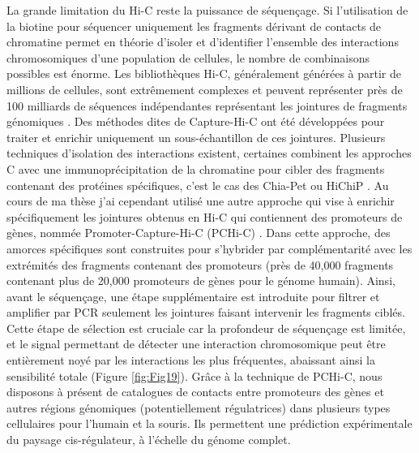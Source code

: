 La grande limitation du \acrshort{Hi-C} reste la puissance de séquençage. Si l’utilisation de la biotine pour séquencer uniquement les fragments dérivant de contacts de chromatine permet en théorie d’isoler et d’identifier l’ensemble des interactions chromosomiques d’une population de cellules, le nombre de combinaisons possibles est énorme. Les bibliothèques \acrshort{Hi-C}, généralement générées à partir de millions de cellules, sont extrêmement complexes et peuvent représenter près de 100 milliards de séquences indépendantes représentant les jointures de fragments génomiques \citep{belton_hic_2012}. Des méthodes dites de Capture-\acrshort{Hi-C} ont été développées pour traiter et enrichir uniquement un sous-échantillon de ces jointures. Plusieurs techniques d’isolation des interactions existent, certaines combinent les approches C avec une immunoprécipitation de la chromatine pour cibler des fragments contenant des protéines spécifiques, c’est le cas des Chia-Pet ou HiChiP \citep{fullwood_chip-based_2009}. Au cours de ma thèse j’ai cependant utilisé une autre approche qui vise à enrichir spécifiquement les jointures obtenus en \acrshort{Hi-C} qui contiennent des promoteurs de gènes, nommée Promoter-Capture-\acrshort{Hi-C} (\acrshort{PCHi-C}) \citep{schoenfelder_pluripotent_2015}. Dans cette approche, des amorces spécifiques sont construites pour s’hybrider par complémentarité avec les extrémités des fragments contenant des promoteurs (près de 40,000 fragments contenant plus de 20,000 promoteurs de gènes pour le génome humain). Ainsi, avant le séquençage, une étape supplémentaire est introduite pour filtrer et amplifier par PCR seulement les jointures faisant intervenir les fragments ciblés. Cette étape de sélection est cruciale car la profondeur de séquençage est limitée, et le signal permettant de détecter une interaction chromosomique peut être entièrement noyé par les interactions les plus fréquentes, abaissant ainsi la sensibilité totale (Figure \ref{fig:Fig19}). Grâce à la technique de \acrshort{PCHi-C}, nous disposons à présent de catalogues de contacts entre promoteurs des gènes et autres régions génomiques (potentiellement régulatrices) dans plusieurs types cellulaires pour l’humain et la souris. Ils permettent une prédiction expérimentale du paysage \gls{cis}-régulateur, à l’échelle du génome complet.\\

